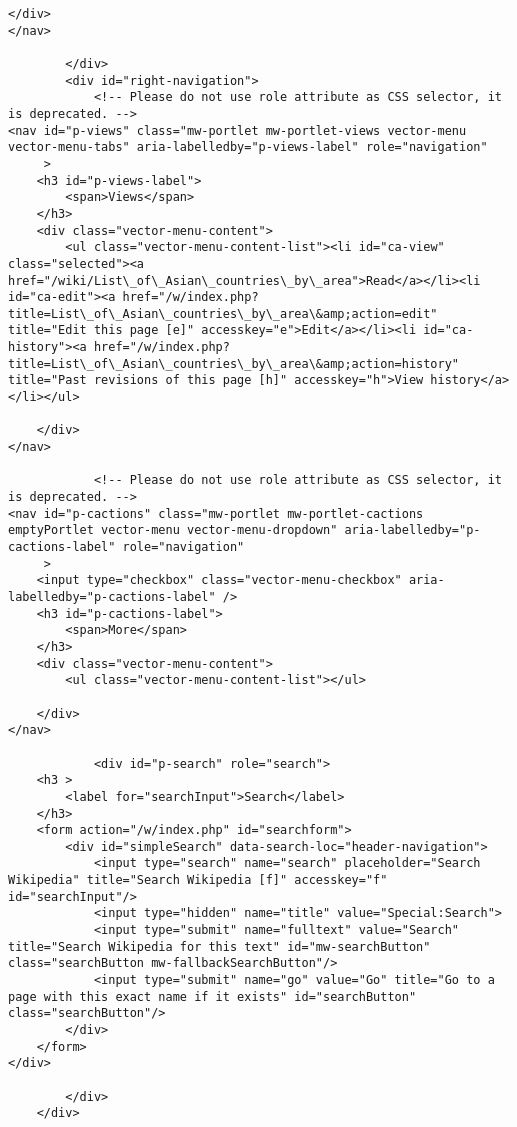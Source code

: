 \documentclass[11pt]{article}
\begin{document}
\begin{Verbatim}[commandchars=\\\{\}]
	</div>
</nav>

		</div>
		<div id="right-navigation">
			<!-- Please do not use role attribute as CSS selector, it is deprecated. -->
<nav id="p-views" class="mw-portlet mw-portlet-views vector-menu vector-menu-tabs" aria-labelledby="p-views-label" role="navigation" 
	 >
	<h3 id="p-views-label">
		<span>Views</span>
	</h3>
	<div class="vector-menu-content">
		<ul class="vector-menu-content-list"><li id="ca-view" class="selected"><a href="/wiki/List\_of\_Asian\_countries\_by\_area">Read</a></li><li id="ca-edit"><a href="/w/index.php?title=List\_of\_Asian\_countries\_by\_area\&amp;action=edit" title="Edit this page [e]" accesskey="e">Edit</a></li><li id="ca-history"><a href="/w/index.php?title=List\_of\_Asian\_countries\_by\_area\&amp;action=history" title="Past revisions of this page [h]" accesskey="h">View history</a></li></ul>
		
	</div>
</nav>

			<!-- Please do not use role attribute as CSS selector, it is deprecated. -->
<nav id="p-cactions" class="mw-portlet mw-portlet-cactions emptyPortlet vector-menu vector-menu-dropdown" aria-labelledby="p-cactions-label" role="navigation" 
	 >
	<input type="checkbox" class="vector-menu-checkbox" aria-labelledby="p-cactions-label" />
	<h3 id="p-cactions-label">
		<span>More</span>
	</h3>
	<div class="vector-menu-content">
		<ul class="vector-menu-content-list"></ul>
		
	</div>
</nav>

			<div id="p-search" role="search">
	<h3 >
		<label for="searchInput">Search</label>
	</h3>
	<form action="/w/index.php" id="searchform">
		<div id="simpleSearch" data-search-loc="header-navigation">
			<input type="search" name="search" placeholder="Search Wikipedia" title="Search Wikipedia [f]" accesskey="f" id="searchInput"/>
			<input type="hidden" name="title" value="Special:Search">
			<input type="submit" name="fulltext" value="Search" title="Search Wikipedia for this text" id="mw-searchButton" class="searchButton mw-fallbackSearchButton"/>
			<input type="submit" name="go" value="Go" title="Go to a page with this exact name if it exists" id="searchButton" class="searchButton"/>
		</div>
	</form>
</div>

		</div>
	</div>
	

\end{Verbatim}
\end{document}

